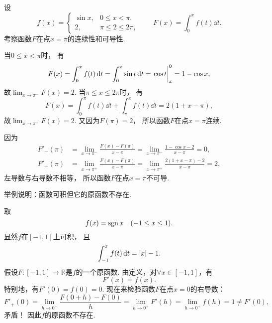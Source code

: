 \begin{example}%
设\begin{equation*}
	f(x) = \left\{ \begin{array}{cl}
		\sin x, & 0 \leq x < \pi, \\
		2, & \pi \leq 2 \leq 2\pi,
	\end{array} \right.
	\qquad
	F(x) = \int_0^x f(t) \dd{t}.
\end{equation*}
考察函数\(F\)在点\(x=\pi\)的连续性和可导性.
\begin{solution}
当\(0 \leq x < \pi\)时，
有\begin{equation*}
	F(x) = \int_0^x f(t) \dd{t}
	= \int_0^x \sin t \dd{t}
	= \eval{\cos t}_x^0
	= 1 - \cos x,
\end{equation*}
故\(\lim_{x\to\pi^-} F(x) = 2\).
当\(\pi \leq x \leq 2\pi\)时，
有\begin{equation*}
	F(x) = \int_0^\pi f(t) \dd{t} + \int_\pi^x f(t) \dd{t}
	= 2(1 + x - \pi),
\end{equation*}
故\(\lim_{x\to\pi^+} F(x) = 2\).
又因为\(F(\pi) = 2\)，
所以函数\(F\)在点\(x=\pi\)连续.

因为\begin{align*}
	F'_-(\pi)
	&= \lim_{x\to\pi^-} \frac{F(x) - F(\pi)}{x - \pi}
	= \lim_{x\to\pi^-} \frac{1 - \cos x - 2}{x - \pi}
	= 0, \\
	F'_+(\pi)
	&= \lim_{x\to\pi^+} \frac{F(x) - F(\pi)}{x - \pi}
	= \lim_{x\to\pi^+} \frac{2(1 + x - \pi) - 2}{x - \pi}
	= 2,
\end{align*}
左导数与右导数不相等，
所以函数\(F\)在点\(x=\pi\)不可导.
\end{solution}
\end{example}

\begin{example}
举例说明：函数可积但它的原函数不存在.
\begin{solution}
取\[
	f(x) = \operatorname{sgn} x
	\quad(-1 \leq x \leq 1).
\]
显然\(f\)在\([-1,1]\)上可积，
且\[
	\int_{-1}^x f(t) \dd{t}
	= \abs{x} - 1.
\]
假设\(F\colon[-1,1]\to\mathbb{R}\)是\(f\)的一个原函数.
由定义，对\(\forall x\in[-1,1]\)，有\[
	F'(x) = f(x).
\]
特别地，有\(F'(0) = f(0) = 0\).
现在来检验函数\(F\)在点\(x=0\)的右导数：\[
	F'_+(0)
	= \lim_{h\to0^+} \frac{F(0+h)-F(0)}{h}
	= \lim_{h\to0^+} F'(h)
	= \lim_{h\to0^+} f(h)
	= 1
	\neq F'(0),
\]
矛盾！
因此\(f\)的原函数不存在.
\end{solution}
\end{example}

